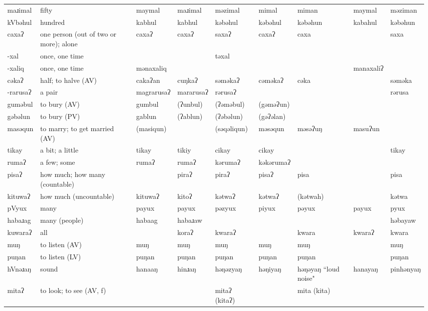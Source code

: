 \begin{landscape}
\begin{longtable}{*{9}{>{\raggedright\arraybackslash}p{}}}
\text{*}maɹimal & fifty & maymal & maɹimal & məzimal & mimal & miman & maymal & məziman\\
\text{*}kVbəhul & hundred & kabhul & kabhul & kəbəhul & kəbəhul & kəbəhun & kabahul & kəbəhun\\
\text{*}caxaʔ & one person (out of two or more); alone & caxaʔ & caxaʔ & saxaʔ & caxaʔ & caxa &  & saxa\\
\text{*}-xal & once, one time &  &  & təxal &  &  &  & \\
\text{*}-xaliq & once, one time & mənaxaliq &  &  &  &  & manaxaliʔ & \\
\text{*}cəkaʔ & half; to halve (AV) & cakaʔan & cuŋkaʔ & səməkaʔ & cəməkaʔ & cəka &  & səməka\\
\text{*}-rarusaʔ & a pair & magrarusaʔ & mararusaʔ & rərusaʔ &  &  &  & rərusa\\
\text{*}guməbul & to bury (AV) & gumbul & (ʔunbul) & (ʔəməbul) & (gəməʔun) &  &  & \\
\text{*}gəbəlun & to bury (PV) & gablun & (ʔablun) & (ʔəbəlun) & (gəʔəlan) &  &  & \\
\text{*}masəqun & to marry; to get married (AV) & (masiqun) &  & (səqəliqun) & məsəqun & məsəʔuŋ & masuʔun & \\
\text{*}tikay & a bit; a little & tikay & tikiy & cikay & cikay &  &  & tikay\\
\text{*}rumaʔ & a few; some & rumaʔ & rumaʔ & kərumaʔ & kəkərumaʔ &  &  & \\
\text{*}pisaʔ & how much; how many (countable) &  & piraʔ & piraʔ & pisaʔ & pisa &  & pisa\\
\text{*}kituwaʔ & how much (uncountable) & kituwaʔ & kitoʔ & kətwaʔ & kətwaʔ & (kətwah) &  & kətwa\\
\text{*}pVyux & many & payux & payux & pəzyux & piyux & pəyux & payux & pyux\\
\text{*}habaɹag & many (people) & habaag & habaɹaw &  &  &  &  & həbayaw\\
\text{*}kuwaraʔ & all &  & koraʔ & kwaraʔ &  & kwara & kwaraʔ & kwara\\
\text{*}muŋ & to listen (AV) & muŋ & muŋ & muŋ & muŋ & muŋ &  & muŋ\\
\text{*}puŋan & to listen (LV) & puŋan & puŋan & puŋan & puŋan & puŋan &  & puŋan\\
\text{*}hVnəɹaŋ & sound & hanaaŋ & hinɹaŋ & həŋəzyaŋ & həŋiyaŋ & həŋəyaŋ \newline ``loud noise" & hanayaŋ & pinhənyaŋ\\
\text{*}mitaʔ & to look; to see (AV, f) &  &  & mitaʔ (kitaʔ) &  & mita (kita) &  & \\

\end{longtable}
\end{landscape}
